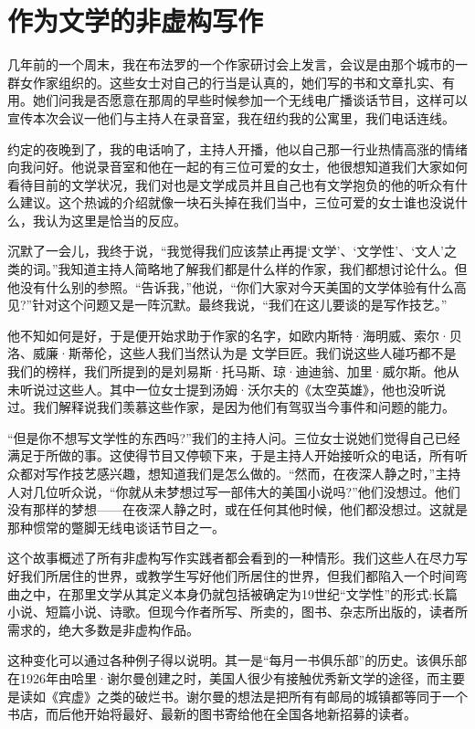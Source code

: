 \chapter{作为文学的非虚构写作}
几年前的一个周末，我在布法罗的一个作家研讨会上发言，会议是由那个城市的一群女作家组织的。这些女士对自己的行当是认真的，她们写的书和文章扎实、有用。她们问我是否愿意在那周的早些时候参加一个无线电广播谈话节目，这样可以宣传本次会议一他们与主持人在录音室，我在纽约我的公寓里，我们电话连线。

约定的夜晚到了，我的电话响了，主持人开播，他以自己那一行业热情高涨的情绪向我问好。他说录音室和他在一起的有三位可爱的女士，他很想知道我们大家如何看待目前的文学状况，我们对也是文学成员并且自己也有文学抱负的他的听众有什么建议。这个热诚的介绍就像一块石头掉在我们当中，三位可爱的女士谁也没说什么，我认为这里是恰当的反应。

沉默了一会儿，我终于说，“我觉得我们应该禁止再提‘文学’、‘文学性’、‘文人’之类的词。”我知道主持人简略地了解我们都是什么样的作家，我们都想讨论什么。但他没有什么别的参照。“告诉我，”他说，“你们大家对今天美国的文学体验有什么高见?”针对这个问题又是一阵沉默。最终我说，“我们在这儿要谈的是写作技艺。”

他不知如何是好，于是便开始求助于作家的名字，如欧内斯特·海明威、索尔·贝洛、威廉·斯蒂伦，这些人我们当然认为是
文学巨匠。我们说这些人碰巧都不是我们的榜样，我们所提到的是刘易斯·托马斯、琼·迪迪翁、加里·威尔斯。他从未听说过这些人。其中一位女士提到汤姆·沃尔夫的《太空英雄》，他也没听说过。我们解释说我们羡慕这些作家，是因为他们有驾驭当今事件和问题的能力。

“但是你不想写文学性的东西吗?”我们的主持人问。三位女士说她们觉得自己已经满足于所做的事。这使得节目又停顿下来，于是主持人开始接听众的电话，所有听众都对写作技艺感兴趣，想知道我们是怎么做的。“然而，在夜深人静之时，”主持人对几位听众说，“你就从未梦想过写一部伟大的美国小说吗?”他们没想过。他们没有那样的梦想——在夜深人静之时，或在任何其他时候，他们都没想过。这就是那种惯常的蹩脚无线电谈话节目之一。

这个故事概述了所有非虚构写作实践者都会看到的一种情形。我们这些人在尽力写好我们所居住的世界，或教学生写好他们所居住的世界，但我们都陷入一个时间弯曲之中，在那里文学从其定义本身仍就包括被确定为19世纪“文学性”的形式:长篇小说、短篇小说、诗歌。但现今作者所写、所卖的，图书、杂志所出版的，读者所需求的，绝大多数是非虚构作品。

这种变化可以通过各种例子得以说明。其一是“每月一书俱乐部”的历史。该俱乐部在1926年由哈里·谢尔曼创建之时，美国人很少有接触优秀新文学的途径，而主要是读如《宾虚》之类的破烂书。谢尔曼的想法是把所有有邮局的城镇都等同于一个书店，而后他开始将最好、最新的图书寄给他在全国各地新招募的读者。

